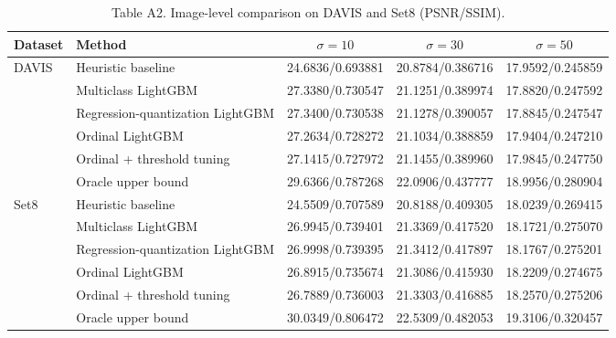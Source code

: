 \begin{table}[t]
\centering
\caption{Table A2. Image-level comparison on DAVIS and Set8 (PSNR/SSIM).}
\label{tab:a2_image}
\setlength{\tabcolsep}{4pt}
\begin{tabular}{llccc}
\toprule
Dataset & Method & $\sigma=10$ & $\sigma=30$ & $\sigma=50$ \\
\midrule
\multirow{6}{*}{DAVIS} & Heuristic baseline & 24.6836/0.693881 & 20.8784/0.386716 & 17.9592/0.245859 \\
 & Multiclass LightGBM & 27.3380/0.730547 & 21.1251/0.389974 & 17.8820/0.247592 \\
 & Regression-quantization LightGBM & 27.3400/0.730538 & 21.1278/0.390057 & 17.8845/0.247547 \\
 & Ordinal LightGBM & 27.2634/0.728272 & 21.1034/0.388859 & 17.9404/0.247210 \\
 & Ordinal + threshold tuning & 27.1415/0.727972 & 21.1455/0.389960 & 17.9845/0.247750 \\
 & Oracle upper bound & 29.6366/0.787268 & 22.0906/0.437777 & 18.9956/0.280904 \\
\midrule
\multirow{6}{*}{Set8} & Heuristic baseline & 24.5509/0.707589 & 20.8188/0.409305 & 18.0239/0.269415 \\
 & Multiclass LightGBM & 26.9945/0.739401 & 21.3369/0.417520 & 18.1721/0.275070 \\
 & Regression-quantization LightGBM & 26.9998/0.739395 & 21.3412/0.417897 & 18.1767/0.275201 \\
 & Ordinal LightGBM & 26.8915/0.735674 & 21.3086/0.415930 & 18.2209/0.274675 \\
 & Ordinal + threshold tuning & 26.7889/0.736003 & 21.3303/0.416885 & 18.2570/0.275206 \\
 & Oracle upper bound & 30.0349/0.806472 & 22.5309/0.482053 & 19.3106/0.320457 \\
\bottomrule
\end{tabular}
\end{table}
